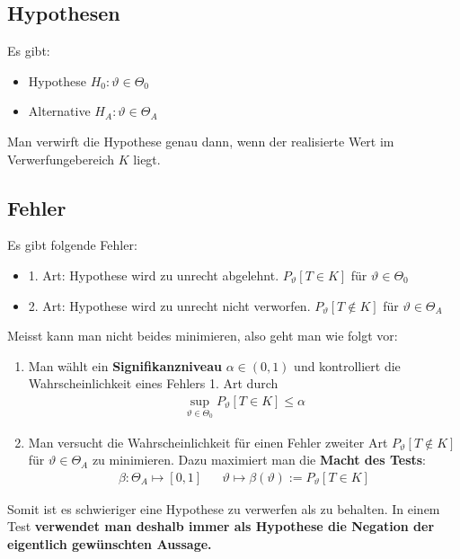 \documentclass[8pt]{extarticle}
\newcommand{\vt}{\vartheta}
\begin{document}
\begin{multicols*}{3}
  \subsection*{Hypothesen}
  Es gibt:
  \begin{itemize}
    \item Hypothese $H_0 : \vt \in \varTheta_0$
    \item Alternative $H_A : \vt \in \varTheta_A$
  \end{itemize}
  Man verwirft die Hypothese genau dann, wenn der realisierte Wert im
  Verwerfungebereich $K$ liegt.
  \subsection*{Fehler}
  Es gibt folgende Fehler:
  \begin{itemize}
    \item 1. Art: Hypothese wird zu unrecht abgelehnt. $P_\vt[T \in K]$ für $\vt \in \varTheta_0$
    \item 2. Art: Hypothese wird zu unrecht nicht verworfen. $P_\vt[T \not \in K]$ für $\vt \in \varTheta_A$
  \end{itemize}
  Meisst kann man nicht beides minimieren, also geht man wie folgt vor:
  \begin{enumerate}
    \item Man wählt ein \textbf{Signifikanzniveau} $\alpha \in  (0, 1)$ und kontrolliert
          die Wahrscheinlichkeit eines Fehlers 1. Art durch
          \begin{align*}
            \sup_{\vt \in \varTheta_0} P_\vt[T \in K] \leq \alpha
          \end{align*}
    \item Man versucht die Wahrscheinlichkeit für einen Fehler zweiter Art $P_\vt[T \not
              \in K]$ für $\vt \in \varTheta_A$ zu minimieren. Dazu maximiert man die
          \textbf{Macht des Tests}:
          \begin{align*}
            \beta : \varTheta_A \mapsto [0, 1] &  & \vt \mapsto \beta (\vt) := P_\vt[T \in K]
          \end{align*}
  \end{enumerate}
  Somit ist es schwieriger eine Hypothese zu verwerfen als zu behalten. In einem
  Test \textbf{verwendet man deshalb immer als Hypothese die Negation der eigentlich gewünschten Aussage.}

\end{multicols*}
\end{document}
